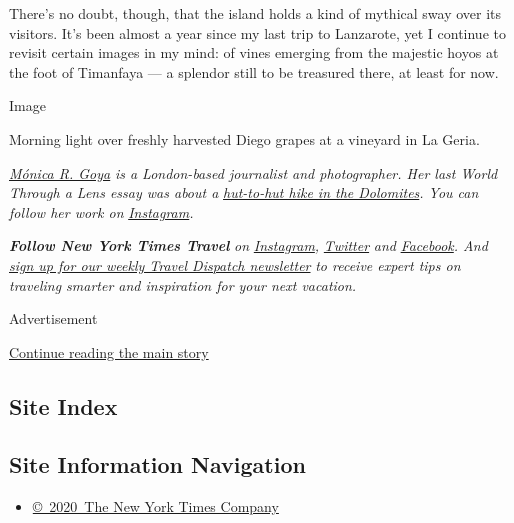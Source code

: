 There's no doubt, though, that the island holds a kind of mythical sway
over its visitors. It's been almost a year since my last trip to
Lanzarote, yet I continue to revisit certain images in my mind: of vines
emerging from the majestic hoyos at the foot of Timanfaya --- a splendor
still to be treasured there, at least for now.

Image

Morning light over freshly harvested Diego grapes at a vineyard in La
Geria.

\href{http://www.monicargoya.com/}{\emph{Mónica R. Goya}} \emph{is a
London-based journalist and photographer. Her last World Through a Lens
essay was about a}
\href{https://www.nytimes3xbfgragh.onion/2020/06/24/travel/dolomites-italy-hut-hiking.html}{\emph{hut-to-hut
hike in the Dolomites}}\emph{. You can follow her work on}
\href{https://www.instagram.com/monicargoya/}{\emph{Instagram}}\emph{.}

\emph{\textbf{Follow New York Times Travel}} \emph{on}
\href{https://www.instagram.com/nytimestravel/}{\emph{Instagram}}\emph{,}
\href{https://twitter.com/nytimestravel}{\emph{Twitter}} \emph{and}
\href{https://www.facebookcorewwwi.onion/nytimestravel/}{\emph{Facebook}}\emph{.
And}
\href{https://www.nytimes3xbfgragh.onion/newsletters/traveldispatch}{\emph{sign
up for our weekly Travel Dispatch newsletter}} \emph{to receive expert
tips on traveling smarter and inspiration for your next vacation.}

Advertisement

\protect\hyperlink{after-bottom}{Continue reading the main story}

\hypertarget{site-index}{%
\subsection{Site Index}\label{site-index}}

\hypertarget{site-information-navigation}{%
\subsection{Site Information
Navigation}\label{site-information-navigation}}

\begin{itemize}
\tightlist
\item
  \href{https://help.nytimes3xbfgragh.onion/hc/en-us/articles/115014792127-Copyright-notice}{©~2020~The
  New York Times Company}
\end{itemize}


